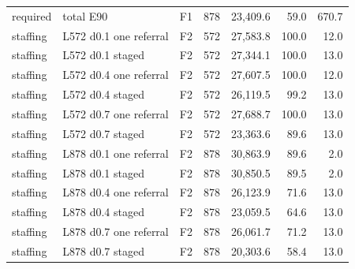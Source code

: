 \begin{longtable}{p{1.8cm}p{3.35cm}lrrrr}
required & total E90 & F1 & 878 & 23,409.6 & 59.0 & 670.7\\
staffing & L572 d0.1 one referral & F2 & 572 & 27,583.8 & 100.0 & 12.0\\
staffing & L572 d0.1 staged & F2 & 572 & 27,344.1 & 100.0 & 13.0\\
staffing & L572 d0.4 one referral & F2 & 572 & 27,607.5 & 100.0 & 12.0\\
staffing & L572 d0.4 staged & F2 & 572 & 26,119.5 & 99.2 & 13.0\\
staffing & L572 d0.7 one referral & F2 & 572 & 27,688.7 & 100.0 & 13.0\\
staffing & L572 d0.7 staged & F2 & 572 & 23,363.6 & 89.6 & 13.0\\
staffing & L878 d0.1 one referral & F2 & 878 & 30,863.9 & 89.6 & 2.0\\
staffing & L878 d0.1 staged & F2 & 878 & 30,850.5 & 89.5 & 2.0\\
staffing & L878 d0.4 one referral & F2 & 878 & 26,123.9 & 71.6 & 13.0\\
staffing & L878 d0.4 staged & F2 & 878 & 23,059.5 & 64.6 & 13.0\\
staffing & L878 d0.7 one referral & F2 & 878 & 26,061.7 & 71.2 & 13.0\\
staffing & L878 d0.7 staged & F2 & 878 & 20,303.6 & 58.4 & 13.0\\
\bottomrule\end{longtable}
